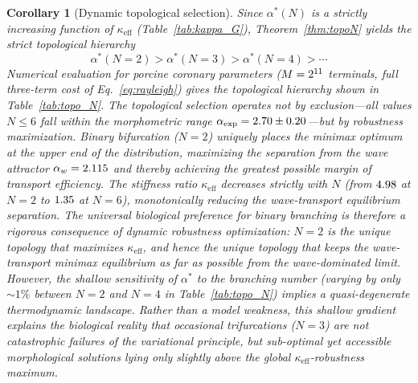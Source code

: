 \documentclass[11pt,a4paper]{article}
\newtheorem{corollary}[theorem]{Corollary}
\theoremstyle{remark}
\begin{document}
\begin{corollary}[Dynamic topological selection]
\label{cor:topoN}
Since $\alpha^*(N)$ is a strictly increasing function of $\kappa_\mathrm{eff}$
(Table~\ref{tab:kappa_G}), Theorem~\ref{thm:topoN} yields the strict topological
hierarchy
\[
  \alpha^*(N=2) > \alpha^*(N=3) > \alpha^*(N=4) > \cdots
\]
Numerical evaluation for porcine coronary parameters ($M = 2^{11}$ terminals,
full three-term cost of Eq.~\eqref{eq:rayleigh}) gives the topological hierarchy
shown in Table~\ref{tab:topo_N}. The topological selection operates not by
exclusion---all values $N \leq 6$ fall within the morphometric range
$\alpha_\mathrm{exp} = 2.70 \pm 0.20$---but by robustness
maximization. Binary bifurcation ($N = 2$) uniquely places the minimax optimum
at the upper end of the distribution, maximizing the separation from the wave
attractor $\alpha_w = 2.115$ and thereby achieving the greatest possible
margin of transport efficiency. The stiffness ratio $\kappa_\mathrm{eff}$
decreases strictly with $N$ (from $4.98$ at $N=2$ to $1.35$ at
$N=6$), monotonically reducing the wave-transport equilibrium separation. The
universal biological preference for binary branching is therefore a rigorous
consequence of dynamic robustness optimization: $N = 2$ is the unique topology
that maximizes $\kappa_\mathrm{eff}$, and hence the unique topology that keeps
the wave-transport minimax equilibrium as far as possible from the
wave-dominated limit. However, the shallow sensitivity of $\alpha^*$ to the
branching number (varying by only $\sim\!1\%$ between $N=2$ and $N=4$ in
Table~\ref{tab:topo_N}) implies a quasi-degenerate thermodynamic landscape.
Rather than a model weakness, this shallow gradient explains the biological
reality that occasional trifurcations ($N=3$) are not catastrophic failures of
the variational principle, but sub-optimal yet accessible morphological
solutions lying only slightly above the global $\kappa_{\text{eff}}$-robustness
maximum.
\end{corollary}
\end{document}
